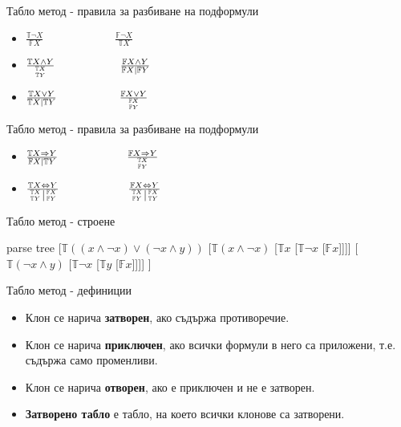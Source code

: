 \documentclass[14pt, aspectratio=169]{beamer}
\newcommand\ST{\mathbb{T}}
\newcommand\SF{\mathbb{F}}
\begin{document}
\begin{frame}{Табло метод - правила за разбиване на подформули}
	\begin{itemize}
	\LARGE
		\item<1-> $\frac{\ST \neg X}{\SF X}\;\;\;\;\;\;\;\;\;\;\;\;\;\;\;\;\;\;\;\;\;\;\ \frac{\SF \neg X}{\ST X}$
		\\ [8mm]
		\item<2-> $\frac{\ST X \land Y}{{\ST X \atop \ST Y}} \;\;\;\;\;\;\;\;\;\;\;\;\;\;\;\;\;\;\;\;\; \frac{\SF X \land Y}{\SF X \mid \SF Y}$
		\\ [8mm]
		\item<3-> $\frac{\ST X \lor Y}{\ST X \mid \ST Y} \;\;\;\;\;\;\;\;\;\;\;\;\;\;\;\;\;\;\;\ \frac{\SF X \lor Y}{{\SF X \atop \SF Y}}$
	\normalsize
	\end{itemize}
\end{frame}

\begin{frame}{Табло метод - правила за разбиване на подформули}
	\begin{itemize}
	\LARGE
		\item<1-> $\frac{\ST X \Rightarrow Y}{\SF X \mid \ST Y} \;\;\;\;\;\;\;\;\;\;\;\;\;\;\;\;\;\;\;\;\;\ \frac{\SF X \Rightarrow Y}{{\ST X \atop \SF Y}}$
		\\ [8mm]
		\item<2-> $\frac{\ST X \Leftrightarrow Y}{\left.{\ST X \atop \ST Y}\right\vert{\SF X \atop \SF Y}} \;\;\;\;\;\;\;\;\;\;\;\;\;\;\;\;\;\;\;\;\;\ \frac{\SF X \Leftrightarrow Y}{\left.{\ST X \atop \SF Y}\right\vert{\SF X \atop \ST Y}}$
	\normalsize
	\end{itemize}
\end{frame}

\begin{frame}{Табло метод - строене}
	\begin{center}
	\begin{forest}
		parse tree
		[$\ST ((x \land \neg x) \lor (\neg x \land y))$
			[$\ST (x \land \neg x)$ [$\ST x$ [$\ST \neg x$ [$\SF x$]]]]
			[$\ST (\neg x \land y)$ [$\ST \neg x$ [$\ST y$ [$\SF x$]]]]
		]
	\end{forest}
	\end{center}
\end{frame}

\begin{frame}{Табло метод - дефиниции}
	\begin{itemize}
		\item<1-> Клон се нарича \textbf{затворен}, ако съдържа противоречие.
		\item<2-> Клон се нарича \textbf{приключен}, ако всички формули в него са приложени, т.е. съдържа само променливи.
		\item<3-> Клон се нарича \textbf{отворен}, ако е приключен и не е затворен.
		\item<4-> \textbf{Затворено табло} е табло, на което всички клонове са затворени.
	\end{itemize}
\end{frame}
\end{document}
